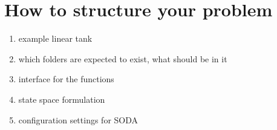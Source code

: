 \chapter{How to structure your problem}

\begin{enumerate}
\item{example linear tank}
\item{which folders are expected to exist, what should be in it}
\item{interface for the functions}
\item{state space formulation}
\item{configuration settings for SODA}
\end{enumerate}
